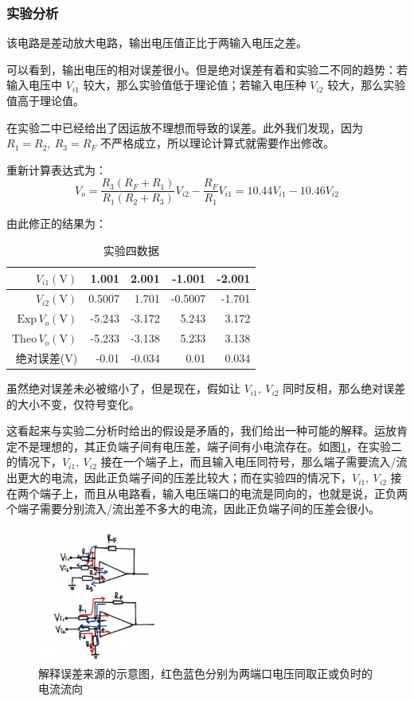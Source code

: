 \documentclass[a4paper,11pt,UTF8]{ctexart}
\newcommand\mr[1]{\mathrm{#1}}
\begin{document}
\subsubsection{实验分析}
该电路是差动放大电路，输出电压值正比于两输入电压之差。
\par 可以看到，输出电压的相对误差很小。但是绝对误差有着和实验二不同的趋势：若输入电压中 $V_{i1}$ 较大，那么实验值低于理论值；若输入电压种 $V_{i2}$ 较大，那么实验值高于理论值。
\par 在实验二中已经给出了因运放不理想而导致的误差。此外我们发现，因为 $R_1=R_2,~R_3=R_F$ 不严格成立，所以理论计算式就需要作出修改。
\par 重新计算表达式为：
\[ V_o=\frac{R_3(R_F+R_1)}{R_1(R_2+R_3)}V_{i2}-\frac{R_F}{R_1}V_{i1}=10.44V_{i1}-10.46V_{i2} \]
\par 由此修正的结果为：
\begin{table}[H]
 \centering
 \begin{tabular}{|r|r|r|r|r|}
 \hline
  $V_{i1}(\mr{V})$ &1.001 &2.001 &-1.001 &-2.001
  \\\hline
  $V_{i2}(\mr{V})$ &0.5007 &1.701 &-0.5007 &-1.701
  \\\hline
  $\mr{Exp}\,V_o(\mr{V})$ &-5.243 &-3.172 &5.243 &3.172
  \\\hline
  $\mr{Theo}\,V_o(\mr{V})$ &-5.233 &-3.138 &5.233 &3.138
  \\\hline
  绝对误差($\mr{V}$) &-0.01 &-0.034 &0.01 &0.034
  \\\hline
 \end{tabular}
 \caption{实验四数据}
\end{table}
\par 虽然绝对误差未必被缩小了，但是现在，假如让 $V_{i1},~V_{i2}$ 同时反相，那么绝对误差的大小不变，仅符号变化。
\par 这看起来与实验二分析时给出的假设是矛盾的，我们给出一种可能的解释。运放肯定不是理想的，其正负端子间有电压差，端子间有小电流存在。如图\ref{fig:Exp04Ana}，在实验二的情况下，$V_{i1},~V_{i2}$ 接在一个端子上，而且输入电压同符号，那么端子需要流入/流出更大的电流，因此正负端子间的压差比较大；而在实验四的情况下，$V_{i1},~V_{i2}$ 接在两个端子上，而且从电路看，输入电压端口的电流是同向的，也就是说，正负两个端子需要分别流入/流出差不多大的电流，因此正负端子间的压差会很小。
\begin{figure}[H]
 \centering
 \includegraphics[width=4cm]{Exp04Ana}
 \caption{解释误差来源的示意图，红色蓝色分别为两端口电压同取正或负时的电流流向}
 \label{fig:Exp04Ana}
\end{figure}
\end{document}
